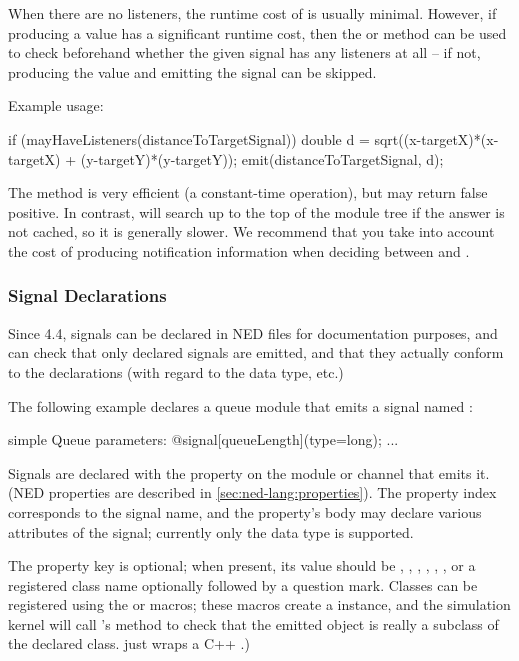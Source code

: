 \begin{ned}
When there are no listeners, the runtime cost of  is usually minimal.
However, if producing a value has a significant runtime cost, then the
 or  method can be used
to check beforehand whether the given signal has any listeners at all --
if not, producing the value and emitting the signal can be skipped.

Example usage:

\begin{cpp}
if (mayHaveListeners(distanceToTargetSignal)) {
    double d = sqrt((x-targetX)*(x-targetX) + (y-targetY)*(y-targetY));
    emit(distanceToTargetSignal, d);
}
\end{cpp}

The  method is very efficient (a constant-time
operation), but may return false positive. In contrast,
 will search up to the top of the module tree if
the answer is not cached, so it is generally slower. We recommend that
you take into account the cost of producing notification information when
deciding between  and .


\subsubsection{Signal Declarations}
\label{sec:simple-modules:signal-declarations}

Since {\opp} 4.4, signals can be declared in NED files for documentation
purposes, and {\opp} can check that only declared signals are emitted,
and that they actually conform to the declarations (with regard to the
data type, etc.)

The following example declares a queue module that emits a signal named
:

\begin{ned}
simple Queue
{
    parameters:
        @signal[queueLength](type=long);
        ...
}
\end{ned}

Signals are declared with the  property on
the module or channel that emits it. (NED properties are described in
\ref{sec:ned-lang:properties}). The property index corresponds
to the signal name, and the property's body may declare various attributes
of the signal; currently only the data type is supported.

The  property key is optional; when present, its value should be
, , , , ,
, or a registered class name optionally followed by a question
mark. Classes can be registered using the  or
 macros; these macros create a
 instance, and the simulation kernel will call
's  method to check that the
emitted object is really a subclass of the declared class.
 just wraps a C++ .)


\end{ned}
